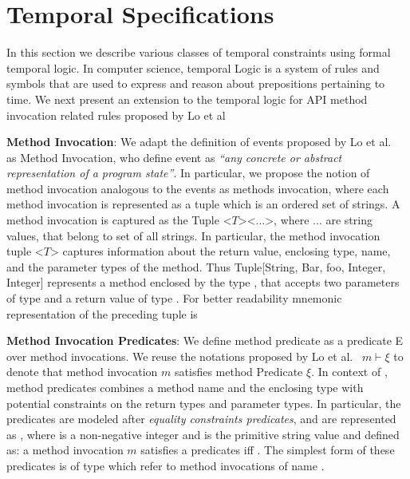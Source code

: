 \section{Temporal Specifications}
\label{sec:temporal}

In this section we describe various classes of temporal constraints using formal temporal logic.
In computer science, temporal Logic is a system of rules and symbols that are used to express and reason about prepositions pertaining to time.
We next present an extension to the temporal logic for API method invocation related rules proposed by Lo et al~\cite{lo2009mining}

\textbf{Method Invocation}: 
We adapt the definition of events proposed by Lo et al.~\cite{lo2009mining} as Method Invocation,
who define event as \textit{``any concrete or abstract representation of a program state''}. 
In particular, we propose the notion of method invocation analogous to the events as methods invocation,
where each method invocation is represented as a tuple which is an ordered set of strings. 
A method invocation is captured as the Tuple <$T$><...>, where ... are string values,
that belong to set of all strings.
In particular, the method invocation tuple <$T$> captures information about the return value, enclosing type, name, and the parameter types of the method.
Thus Tuple[String, Bar, foo, Integer, Integer] represents a method  enclosed by the type ,
that accepts two parameters of type  and a return value of type . 
For better readability mnemonic representation of the preceding tuple is 



\textbf{Method Invocation Predicates}: We define method predicate as a predicate E over method invocations.
We reuse the notations proposed by Lo et al.~\cite{lo2009mining} $m \vdash \xi$ to denote that method invocation $m$ satisfies method Predicate $\xi$.
In context of \tool, method predicates combines a method name and the enclosing type with potential constraints on the return types and parameter types. 
In particular, the predicates are modeled after \textit{equality constraints predicates}, and are represented as , where  is a non-negative integer and  is the primitive string value and defined as: a method invocation $m$ satisfies a predicates  iff . The simplest form of these predicates is of type  which refer to method invocations of name .

